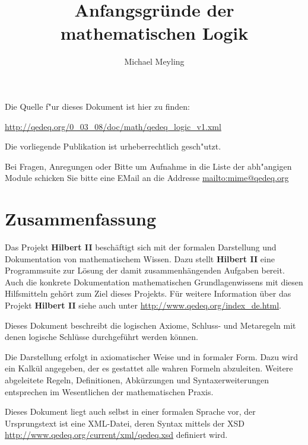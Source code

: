\documentclass[a4paper,german,10pt,twoside]{book}
\title{Anfangsgr{\"u}nde der mathematischen Logik}
\author{
Michael Meyling
}
\theoremstyle{definition}
\theoremstyle{remark}
\begin{document}
\maketitle

\setlength{\parskip}{5pt plus 2pt minus 1pt}
\mbox{}
\vfill

\par
Die Quelle f{"ur} dieses Dokument ist hier zu finden:
\par
\url{http://qedeq.org/0_03_08/doc/math/qedeq_logic_v1.xml}

\par
Die vorliegende Publikation ist urheberrechtlich gesch{"u}tzt.
\par
Bei Fragen, Anregungen oder Bitte um Aufnahme in die Liste der abh{"a}ngigen Module schicken Sie bitte eine EMail an die Addresse \url{mailto:mime@qedeq.org}

\setlength{\parskip}{0pt}
\tableofcontents

\setlength{\parskip}{5pt plus 2pt minus 1pt}

\chapter*{Zusammenfassung} \label{chapter0} \hypertarget{chapter0}{}

Das Projekt \textbf{Hilbert II} besch{\"a}ftigt sich mit der formalen Darstellung und Dokumentation von mathematischem Wissen. Dazu stellt \textbf{Hilbert II} eine Programmsuite zur L{\"o}sung der damit zusammenh{\"a}ngenden Aufgaben bereit. Auch die konkrete Dokumentation mathematischen Grundlagenwissens mit diesen Hilfsmitteln geh{\"o}rt zum Ziel dieses Projekts. 
F{\"u}r weitere Information {\"u}ber das Projekt \textbf{Hilbert II} siehe auch unter \url{http://www.qedeq.org/index_de.html}.

\par
Dieses Dokument beschreibt die logischen Axiome, Schluss- und Metaregeln mit denen logische Schl{\"u}sse durchgef{\"u}hrt werden k{\"o}nnen.

\par
Die Darstellung erfolgt in axiomatischer Weise und in formaler Form. Dazu wird ein Kalk{\"u}l angegeben, der es gestattet alle wahren Formeln abzuleiten. Weitere abgeleitete Regeln, Definitionen, Abk{\"u}rzungen und Syntaxerweiterungen entsprechen im Wesentlichen der mathematischen Praxis.

\par
Dieses Dokument liegt auch selbst in einer formalen Sprache vor, der Ursprungstext ist eine XML-Datei, deren Syntax mittels der XSD \url{http://www.qedeq.org/current/xml/qedeq.xsd} definiert wird.
\end{document}
